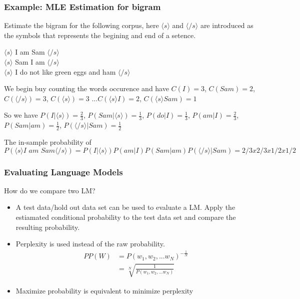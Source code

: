 \documentclass[notheorems, aspectratio=54]{beamer}
\begin{document}
\begin{frame}
\frametitle{Example: MLE Estimation for bigram }
Estimate the bigram for the following corpus, here $\langle s \rangle$ and $\langle /s\rangle$ are introduced as the symbols that represents the begining and  end of a setence.

$\langle s \rangle$ I am Sam $\langle /s\rangle$\\
$\langle s \rangle$ Sam I am $\langle /s\rangle$\\
$\langle s \rangle$ I do not like green eggs and ham $\langle /s \rangle$

We begin buy counting the words occurence and have $C(I)=3$, $C(Sam)=2$, $C(\langle /s\rangle)=3$, $C(\langle s\rangle)=3$ ...$C(\langle s \rangle I)=2$, $C(\langle s \rangle Sam)=1$

\vspace{0.2cm}

So we have $P(I|\langle s \rangle)=\frac{2}{3}$, $P(Sam|\langle s \rangle)=\frac{1}{3}$, $P(do|I)=\frac{1}{3}$, $P(am|I)=\frac{2}{3}$, $P(Sam|am)=\frac{1}{2}$, $P(\langle /s\rangle | Sam)=\frac{1}{2}$

\vspace{0.2cm}

The in-sample probability of $P(\langle s \rangle \textit{I am Sam}\langle /s\rangle)=P(I|\langle s \rangle)P(am|I)P(Sam|am)P(\langle /s\rangle | Sam)=2/3x2/3x1/2x1/2$

\end{frame}

\begin{frame}
\frametitle{Evaluating Language Models}
How do we compare two LM?
\begin{itemize}
\item A test data/hold out data set can be used to evaluate a LM. Apply the estiamated conditional probability to the test data set and compare the resulting probability.
\item Perplexity is used instead of the raw probability. 
\begin{align*}
	PP(W)&=P(w_1, w_2, ...w_N)^{-\frac{1}{N}}\\
	&=\sqrt[N]{\frac{1}{P(w_1, w_2, ...w_N)}}
\end{align*}
\item Maximize probability is equivalent to minimize perplexity

\end{itemize}
\end{frame}
\end{document}
